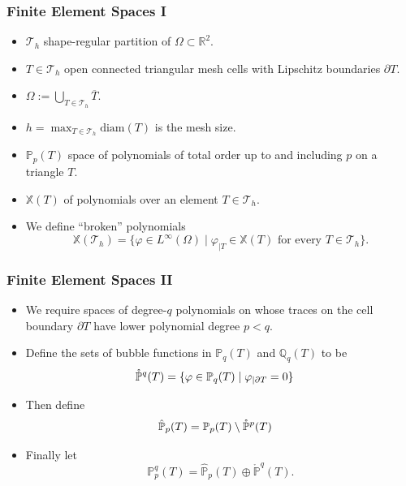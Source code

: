 \documentclass[aspectratio=169,xcolor=dvipsnames,11pt]{beamer}
\begin{document}
\begin{frame}\frametitle{Finite Element Spaces I}
\begin{itemize}
\item $\mathcal{T}_h$ shape-regular partition of $\Omega \subset \mathbb{R}^2$.
\item $T \in \mathcal{T}_h$ open connected triangular mesh cells with Lipschitz boundaries $\partial T$.
\item  $\Omega := \bigcup_{T \in \mathcal{T}_h} \overline{T}$.
\item $h = \max_{T\in\mathcal{T}_h} \mathrm{diam}(T)$ is the mesh size.
\item $\mathbb{P}_{p}(T)$  space of polynomials of total order up to and including $p$ on a triangle $T$.
\item $\mathbb{X}(T)$ of polynomials over an element $T \in \mathcal{T}_h$.
\item We define ``broken'' polynomials 
\[
\mathbb{X}(\mathcal{T}_h) = \{\varphi \in L^\infty(\Omega) \mid \varphi_{|T} \in \mathbb{X}(T) \text{~for every~} T \in \mathcal{T}_h\}.
\]
\end{itemize}

\end{frame}

\begin{frame}\frametitle{Finite Element Spaces II}
\begin{itemize}
\item We require spaces of degree-$q$ polynomials on whose traces on the cell boundary $\partial T$ have lower polynomial degree $p < q$.
\item Define the sets of bubble functions in $\mathbb{P}_{q}(T)$ and $\mathbb{Q}_{q}(T)$ to be 
\[
\aligned
\mathring{\mathbb{P}}^{q}(T) &= \{ \varphi \in \mathbb{P}_{q}(T) \mid \varphi_{|\partial T} =  0\}%
\endaligned
\]
\item Then define 
\[
\aligned
\hat{\mathbb{P}}_{p}(T) &= \mathbb{P}_{p}(T) \setminus \mathring{\mathbb{P}}^{p}(T)%
\endaligned
\]
\item Finally
let
\begin{equation}
	\mathbb{P}_p^q(T) = \hat{\mathbb{P}}_{p}(T) \oplus \mathring{\mathbb{P}}^{q}(T).
\end{equation}
\end{itemize}
\end{frame}
\end{document}

